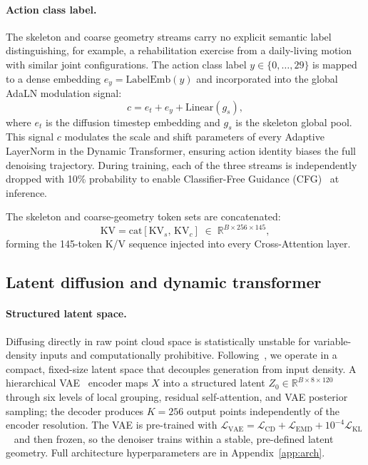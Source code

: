 \documentclass{article}
\newcommand{\Rbb}{\mathbb{R}}
\begin{document}
\paragraph{Action class label.}
The skeleton and coarse geometry streams carry no explicit semantic label
distinguishing, for example, a rehabilitation exercise from a daily-living
motion with similar joint configurations.
The action class label $y\!\in\!\{0,\ldots,29\}$
is mapped to a dense embedding $e_y\!=\!\mathrm{LabelEmb}(y)$ and incorporated
into the global AdaLN modulation signal:
\begin{equation}
  c = e_t + e_y + \mathrm{Linear}(g_s),
\end{equation}
where $e_t$ is the diffusion timestep embedding and $g_s$ is the skeleton
global pool.
This signal $c$ modulates the scale and shift parameters of every Adaptive
LayerNorm in the Dynamic Transformer, ensuring action identity biases
the full denoising trajectory.
During training, each of the three streams is independently dropped with 10\%
probability to enable Classifier-Free Guidance (CFG)~\cite{cfg} at inference.

The skeleton and coarse-geometry token sets are concatenated:
\begin{equation}
  \mathrm{KV}
    = \mathrm{cat}[\mathrm{KV}_s,\,\mathrm{KV}_c]
    \;\in\;\Rbb^{B\times256\times145},
\end{equation}
forming the 145-token K/V sequence injected into every Cross-Attention layer.

\subsection{Latent diffusion and dynamic transformer}
\label{sec:diffusion}

\paragraph{Structured latent space.}
Diffusing directly in raw point cloud space is statistically unstable for
variable-density inputs and computationally prohibitive.
Following~\cite{lion,ldm}, we operate in a compact, fixed-size latent space that
decouples generation from input density.
A hierarchical VAE~\cite{vae} encoder maps $X$ into a structured latent
$Z_0\!\in\!\Rbb^{B\times8\times120}$ through six levels of local grouping,
residual self-attention, and VAE posterior sampling; the decoder produces
$K\!=\!256$ output points independently of the encoder resolution.
The VAE is pre-trained with
$\mathcal{L}_\text{VAE}=\mathcal{L}_\text{CD}+\mathcal{L}_\text{EMD}
+10^{-4}\mathcal{L}_\text{KL}$~\cite{emd} and then frozen, so the denoiser trains within
a stable, pre-defined latent geometry.
Full architecture hyperparameters are in Appendix~\ref{app:arch}.
\end{document}
